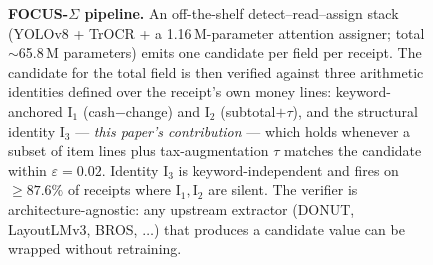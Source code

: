 \begin{figure}[t]

\caption{%
\textbf{FOCUS-$\Sigma$ pipeline.}  An off-the-shelf detect–read–assign
stack (YOLOv8 + TrOCR + a 1.16\,M-parameter attention assigner; total
$\sim$65.8\,M parameters) emits one candidate per field per receipt.
The candidate for the \textsf{total} field is then verified against
three arithmetic identities defined over the receipt's own money
lines: keyword-anchored $\mathrm{I}_1$ (cash$-$change) and
$\mathrm{I}_2$ (subtotal$+\tau$), and the structural identity
$\mathrm{I}_3$ — \emph{this paper's contribution} — which holds
whenever a subset of item lines plus tax-augmentation $\tau$ matches
the candidate within $\varepsilon=0.02$.  Identity $\mathrm{I}_3$ is
keyword-independent and fires on $\geq 87.6\%$ of receipts where
$\mathrm{I}_1, \mathrm{I}_2$ are silent.  The verifier is
architecture-agnostic: any upstream extractor (DONUT, LayoutLMv3,
BROS, $\dots$) that produces a candidate value can be wrapped without
retraining.}
\label{fig:architecture}
\end{figure}
